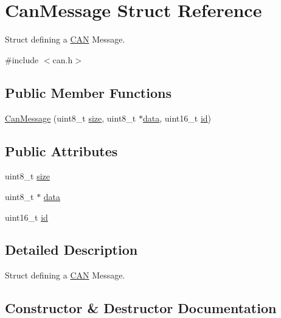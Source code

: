 \hypertarget{struct_can_message}{}\section{Can\+Message Struct Reference}
\label{struct_can_message}


Struct defining a \hyperlink{class_c_a_n}{C\+AN} Message.  




{\ttfamily \#include $<$can.\+h$>$}

\subsection*{Public Member Functions}
\begin{DoxyCompactItemize}
\item 
\hyperlink{struct_can_message_ae51e016fc886677c95e933db98ad79bc}{Can\+Message} (uint8\+\_\+t \hyperlink{struct_can_message_ae1bbc2852a072a1c2009adee212a630d}{size}, uint8\+\_\+t $\ast$\hyperlink{struct_can_message_a3366bf0b4f8e6a333567b1c93d0c8465}{data}, uint16\+\_\+t \hyperlink{struct_can_message_ad289d1b330fcf06123ca872a79f641d9}{id})
\end{DoxyCompactItemize}
\subsection*{Public Attributes}
\begin{DoxyCompactItemize}
\item 
uint8\+\_\+t \hyperlink{struct_can_message_ae1bbc2852a072a1c2009adee212a630d}{size}
\item 
uint8\+\_\+t $\ast$ \hyperlink{struct_can_message_a3366bf0b4f8e6a333567b1c93d0c8465}{data}
\item 
uint16\+\_\+t \hyperlink{struct_can_message_ad289d1b330fcf06123ca872a79f641d9}{id}
\end{DoxyCompactItemize}


\subsection{Detailed Description}
Struct defining a \hyperlink{class_c_a_n}{C\+AN} Message. 

\subsection{Constructor \& Destructor Documentation}
\hypertarget{struct_can_message_ae51e016fc886677c95e933db98ad79bc}{}\label{struct_can_message_ae51e016fc886677c95e933db98ad79bc} 
